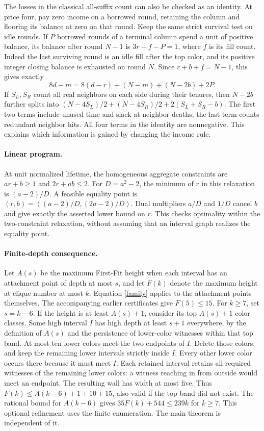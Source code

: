 \documentclass[11pt]{article}
\begin{document}
The losses in the classical all-suffix count can also be checked as an
identity. At price four, pay zero income on a borrowed round, retaining
the column and flooring its balance at zero on that round. Keep the
same strict survival test on idle rounds. If $P$ borrowed rounds of a
terminal column spend a unit of positive balance, its balance after
round $N-1$ is $3r-f-P=1$, where $f$ is its fill count. Indeed the last
surviving round is an idle fill after the top color, and its positive
integer closing balance is exhausted on round $N$. Since
$r+b+f=N-1$, this gives exactly
\[
8d-m=8(d-r)+(N-m)+(N-2b)+2P.
\]
If $S_L,S_R$ count all real neighbors on each side during their
tenures, then $N-2b$ further splits into
$(N-4S_L)/2+(N-4S_R)/2+2(S_L+S_R-b)$.
The first two terms include unused time and slack at neighbor deaths;
the last term counts redundant neighbor hits. All four terms in the
identity are nonnegative. This explains which information is gained by
changing the income rule.

\paragraph{Linear program.}
At unit normalized lifetime, the homogeneous aggregate constraints are
$ar+b\ge1$ and $2r+ab\le2$. For $D=a^2-2$, the minimum of $r$ in this
relaxation is $(a-2)/D$. A feasible equality point is
$(r,b)=((a-2)/D,(2a-2)/D)$. Dual multipliers $a/D$ and $1/D$ cancel
$b$ and give exactly the asserted lower bound on $r$. This checks
optimality within the two-constraint relaxation, without assuming that
an interval graph realizes the equality point.

\paragraph{Finite-depth consequence.}
Let $A(s)$ be the maximum First-Fit height when each interval has an
attachment point of depth at most $s$, and let $F(k)$ denote the maximum
height at clique number at most $k$. Equation \eqref{family} applies to
the attachment points themselves. The accompanying earlier certificates
give $F(5)\le15$. For $k\ge7$, set $s=k-6$. If the height is at least
$A(s)+1$, consider its top $A(s)+1$ color classes. Some high interval
$I$ has high depth at least $s+1$ everywhere, by the definition of
$A(s)$ and the persistence of lower-color witnesses within that top band.
At most ten lower colors meet the two endpoints of $I$. Delete those
colors, and keep the remaining lower intervals strictly inside $I$.
Every other lower color occurs there because it must meet $I$.
Each retained interval retains all required witnesses of the remaining
lower colors: a witness reaching in from outside would meet an endpoint.
The resulting wall has width at most five. Thus
$F(k)\le A(k-6)+1+10+15$, also valid if the top band did not exist.
The rational bound for $A(k-6)$ gives $35F(k)+544\le239k$ for $k\ge7$.
This optional refinement uses the finite enumeration. The main theorem
is independent of it.
\end{document}
